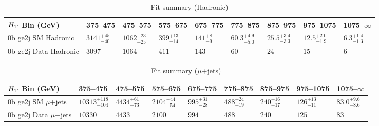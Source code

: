 \documentclass[8pt]{article}
\def\scalht{\mbox{$H_{\rm{T}}$}\xspace}
\newcommand\T{\rule{0pt}{2.6ex}}
\begin{document}
\begin{table}[ht!]
\caption{Fit summary (Hadronic)}
\label{tab:ensemble-summary}
\centering
\begin{tabular}{ lllllllll }

\hline
\scalht Bin (GeV)       & 375--475                       & 475--575                       & 575--675                       & 675--775                       & 775--875                       & 875--975                       & 975--1075                      & 1075--$\infty$                 \\ [1.000000ex]
\hline
0b ge2j SM Hadronic\T   & $3141^{+45}_{-40}$             & $1062^{+23}_{-25}$             & $399^{+13}_{-14}$              & $141^{+8}_{-9}$                & $60.3^{+4.9}_{-5.0}$           & $25.5^{+3.4}_{-3.3}$           & $12.5^{+2.0}_{-1.9}$           & $6.3^{+1.4}_{-1.3}$            \\ 
0b ge2j Data Hadronic\T & $3097$                         & $1064$                         & $411$                          & $143$                          & $60$                           & $24$                           & $15$                           & $6$                            \\ 
\hline

\end{tabular}
\end{table}
\begin{table}[ht!]
\caption{Fit summary ($\mu$+jets)}
\label{tab:ensemble-summary}
\centering
\begin{tabular}{ lllllllll }

\hline
\scalht Bin (GeV)       & 375--475                       & 475--575                       & 575--675                       & 675--775                       & 775--875                       & 875--975                       & 975--1075                      & 1075--$\infty$                 \\ [1.000000ex]
\hline
0b ge2j SM $\mu$+jets\T & $10313^{+118}_{-104}$          & $4434^{+61}_{-73}$             & $2104^{+44}_{-54}$             & $995^{+31}_{-28}$              & $488^{+24}_{-19}$              & $240^{+16}_{-17}$              & $126^{+13}_{-11}$              & $83.0^{+9.6}_{-8.6}$           \\ 
0b ge2j Data $\mu$+jets\T & $10330$                        & $4433$                         & $2100$                         & $994$                          & $488$                          & $240$                          & $125$                          & $83$                           \\ 
\hline

\end{tabular}
\end{table}
\end{document}
